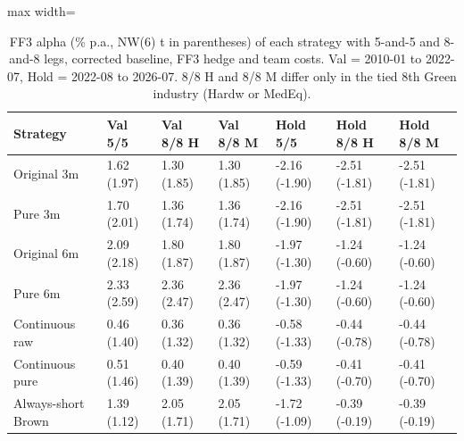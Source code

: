 \begin{table}[H]
\centering\small
\caption{FF3 alpha (\% p.a., NW(6) t in parentheses) of each strategy with 5-and-5 and 8-and-8 legs, corrected baseline, FF3 hedge and team costs. Val = 2010-01 to 2022-07, Hold = 2022-08 to 2026-07. 8/8 H and 8/8 M differ only in the tied 8th Green industry (Hardw or MedEq).}
\label{tab:m2_q1_corr}
\begin{adjustbox}{max width=\linewidth}
\begin{tabular}{lllllll}
\toprule
Strategy & Val 5/5 & Val 8/8 H & Val 8/8 M & Hold 5/5 & Hold 8/8 H & Hold 8/8 M \\
\midrule
Original 3m & 1.62 (1.97) & 1.30 (1.85) & 1.30 (1.85) & -2.16 (-1.90) & -2.51 (-1.81) & -2.51 (-1.81) \\
Pure 3m & 1.70 (2.01) & 1.36 (1.74) & 1.36 (1.74) & -2.16 (-1.90) & -2.51 (-1.81) & -2.51 (-1.81) \\
Original 6m & 2.09 (2.18) & 1.80 (1.87) & 1.80 (1.87) & -1.97 (-1.30) & -1.24 (-0.60) & -1.24 (-0.60) \\
Pure 6m & 2.33 (2.59) & 2.36 (2.47) & 2.36 (2.47) & -1.97 (-1.30) & -1.24 (-0.60) & -1.24 (-0.60) \\
Continuous raw & 0.46 (1.40) & 0.36 (1.32) & 0.36 (1.32) & -0.58 (-1.33) & -0.44 (-0.78) & -0.44 (-0.78) \\
Continuous pure & 0.51 (1.46) & 0.40 (1.39) & 0.40 (1.39) & -0.59 (-1.33) & -0.41 (-0.70) & -0.41 (-0.70) \\
Always-short Brown & 1.39 (1.12) & 2.05 (1.71) & 2.05 (1.71) & -1.72 (-1.09) & -0.39 (-0.19) & -0.39 (-0.19) \\
\bottomrule
\end{tabular}
\end{adjustbox}
\end{table}
